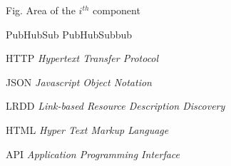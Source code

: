 \begin{siglas}
  \item[Fig.] Area of the $i^{th}$ component
  \item[PubHubSub] PubHubSubbub
  \item[HTTP] \textit{Hypertext Transfer Protocol}
  \item[JSON] \textit{Javascript Object Notation}
  \item[LRDD] \textit{Link-based Resource Description Discovery}
  \item[HTML] \textit{Hyper Text Markup Language}
  \item[API] \textit{Application Programming Interface}
\end{siglas}
